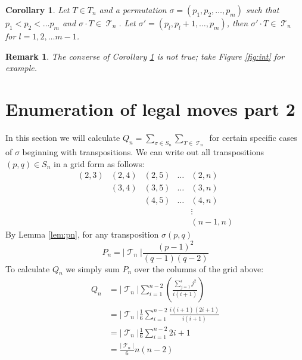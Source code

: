 \documentclass[10pt]{amsart} %
\newtheorem{remk}{Remark}
\newtheorem{corol}{Corollary}
\theoremstyle{definition}
\DeclareMathOperator{\T}{\mathcal{T}}
\begin{document}
\begin{corol}\label{cor:subsig}
 Let $T \in T_n$ and a permutation $ \sigma  = (p_1,p_2,\dots,p_m)$ such that $p_1 < p_2 < \dots p_m$ and $\sigma \cdot T \in \T_n$.  Let $\sigma' = (p_l,p_l+1,\dots,p_m)$, then $\sigma' \cdot T \in \T_n$ for $l = 1,2,\dots m-1$.
\end{corol}

\begin{remk}
 The converse of Corollary \ref{cor:subsig} is not true; take Figure \ref{fig:int} for example.
\end{remk}

 \section{Enumeration of legal moves part 2}
In this section we will calculate $Q_n = \sum_{\sigma \in S_n}\sum_{T \in \T_n}$ for certain specific cases of $\sigma$ beginning with transpositions.  We can write out all transpositions $(p,q) \in S_n$ in a grid form as follows:
 \[ \begin{array}{c|c|c|c|c}
     (2,3)  & (2,4)  & (2,5) & \dots & (2,n) \\
       & (3,4)  & (3,5) & \dots &(3,n) \\
       &        &  (4,5) & \dots & (4,n) \\
       &&&& \vdots \\
       &&&&(n-1,n)
    \end{array} 
\]
By Lemma \ref{lem:pn}, for any transposition $\sigma(p,q)$ 
\[P_n = \lvert \T_n\rvert\frac{(p-1)^{2}}{(q-1)(q-2)}\]
To calculate $Q_n$ we simply sum $P_n$ over the columns of the grid above:  
\begin{align*}
 Q_{n} &= \lvert \T_n\rvert\sum_{i=1}^{n-2} \left( \frac{ \sum_{j=1}^{i} j^2}{i(i+1)} \right) \\
 &= \lvert \T_n\rvert\frac{1}{6} \sum_{i=1}^{n-2} \frac{i(i+1)(2i +1)}{i(i+1)}\\
 &= \lvert \T_n\rvert\frac{1}{6} \sum_{i=1}^{n-2} 2i +1 \\
 & = \frac{\lvert \T_n\rvert}{6} n(n-2) 
\end{align*}
\end{document}
